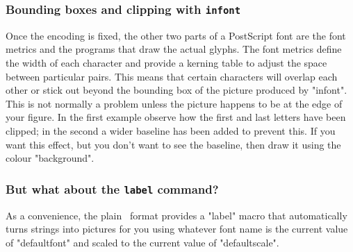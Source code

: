 \documentclass[a4paper,landscape]{article}
\begin{document}
\subsubsection{Bounding boxes and clipping with \texttt{infont}}

Once the encoding is fixed, the other two parts of a PostScript font are the font
metrics and the programs that draw the actual glyphs.  The font metrics define the
width of each character and provide a kerning table to adjust the space between
particular pairs. This means that certain characters will overlap each other or stick out
beyond the bounding box of the picture produced by "infont".  This is not normally a
problem unless the picture happens to be at the edge of your figure.  In the first
example observe how the first and last letters have been clipped; in the second a
wider baseline has been added to prevent this.  
If you want this effect, but you
don't want to see the baseline, then draw it 
using the colour "background".

\subsubsection{But what about the \texttt{label} command?}

As a convenience, the plain \MP\ format provides a "label" macro that automatically
turns strings into pictures for you using whatever font name is the current value of
"defaultfont" and scaled to the current value of "defaultscale".
\end{document}
